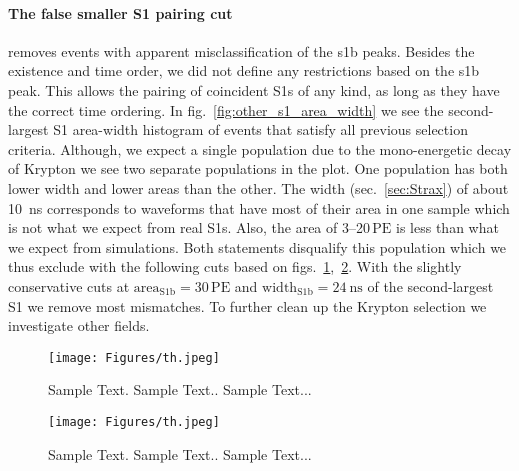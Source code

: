 \paragraph{The false smaller S1 pairing cut} removes events with apparent misclassification of the \gls{s1b} peaks.
Besides the existence and time order, we did not define any restrictions based on the \gls{s1b} peak.
This allows the pairing of coincident S1s of any kind, as long as they have the correct time ordering.
In fig.~\ref{fig:other_s1_area_width} we see the second-largest S1 area-width histogram of events that satisfy all previous selection criteria.
Although, we expect a single population due to the mono-energetic decay of Krypton we see two separate populations in the plot.
One population has both lower width and lower areas than the other.
The width (sec.~\ref{sec:Strax}) of about \SI{10}{\nano\s} corresponds to waveforms that have most of their area in one sample which is not what we expect from real S1s.
Also, the area of \numrange{3}{20}$\,\mathrm{PE}$ is less than what we expect from simulations.
Both statements disqualify this population which we thus exclude with the following cuts based on figs.~\ref{fig:other_s1_area_cut},~\ref{fig:other_s1_width_cut}.
With the slightly conservative cuts at $ \mathrm{area}_\mathrm{S1b} = 30\,\mathrm{PE}$ and $ \mathrm{width}_\mathrm{S1b} = \SI{24}{\nano\s} $ of the second-largest S1 we remove most mismatches.
To further clean up the Krypton selection we investigate other fields.


\begin{figure}[h]
\centering
\texttt{[image: Figures/th.jpeg]}  %
\caption[Other S1 Area Histogram Cut]{
        Sample Text.
        Sample Text..
        Sample Text...
    }
\label{fig:other_s1_area_cut}
\end{figure}


\begin{figure}
\centering
\texttt{[image: Figures/th.jpeg]}  %
\caption[Other S1 Width Histogram Cut]{
        Sample Text.
        Sample Text..
        Sample Text...
    }
\label{fig:other_s1_width_cut}
\end{figure}


